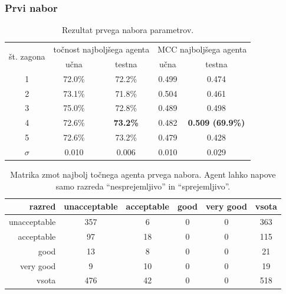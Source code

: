 \subsubsection{Prvi nabor}
\begin{table}[H]
    \begin{center}
        \begin{tabular}{|| c | c c || c c ||}
            \hline
            \multirow{2}{*}{št. zagona} & \multicolumn{2}{c||}{točnost najboljšega agenta} & \multicolumn{2}{c||}{MCC najboljšega agenta} \\ \cline{2-5}
            & učna   & testna          & učna  & testna                  \\
            \hline
            1        & 72.0\% & 72.2\%          & 0.499 & 0.474                   \\
            \hline
            2        & 73.1\% & 71.8\%          & 0.504 & 0.461                   \\
            \hline
            3        & 75.0\% & 72.8\%          & 0.489 & 0.498                   \\
            \hline
            4        & 72.6\% & \textbf{73.2\%} & 0.482 & \textbf{0.509 (69.9\%)} \\
            \hline
            5        & 72.6\% & 73.2\%          & 0.479 & 0.428                   \\
            \hline
            $\sigma$ & 0.010  & 0.006           & 0.010 & 0.029                   \\
            \hline
        \end{tabular}
    \end{center}
    \caption{Rezultat prvega nabora parametrov.}
    \label{tab:car_result_1}
\end{table}

\begin{table}[H]
    \centering
    \begin{tabular}{||rccccc||}
        \hline
        razred       & unacceptable & acceptable & good & very good & vsota \\ \hline
        unacceptable & 357          & 6          & 0    & 0         & 363   \\ \hline
        acceptable   & 97           & 18         & 0    & 0         & 115   \\ \hline
        good         & 13           & 8          & 0    & 0         & 21    \\ \hline
        very good    & 9            & 10         & 0    & 0         & 19    \\ \hline
        vsota        & 476          & 42         & 0    & 0         & 518   \\ \hline
    \end{tabular}
    \caption{Matrika zmot najbolj točnega agenta prvega nabora. Agent lahko napove samo razreda \enquote{nesprejemljivo} in \enquote{sprejemljivo}.}
    \label{tab:car_acc_1}
\end{table}

